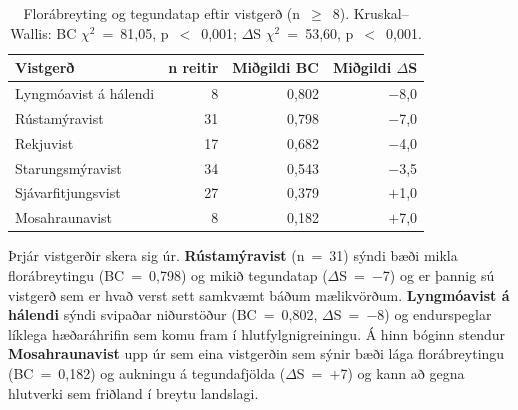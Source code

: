 \documentclass[12pt,a4paper]{article}
\begin{document}
\begin{table}[H]
\centering
\caption{Florábreyting og tegundatap eftir vistgerð (n~$\geq$~8).
Kruskal--Wallis: BC $\chi^2$~=~81,05, p~$<$~0,001;
$\Delta$S $\chi^2$~=~53,60, p~$<$~0,001.}
\label{tab:hab}
\begin{tabular}{lrrr}
\toprule
Vistgerð & n reitir & Miðgildi BC & Miðgildi $\Delta$S \\
\midrule
Lyngmóavist á hálendi  &  8 & 0,802 & $-$8,0 \\
Rústamýravist          & 31 & 0,798 & $-$7,0 \\
Rekjuvist              & 17 & 0,682 & $-$4,0 \\
Starungsmýravist       & 34 & 0,543 & $-$3,5 \\
Sjávarfitjungsvist     & 27 & 0,379 &  $+$1,0 \\
Mosahraunavist         &  8 & 0,182 &  $+$7,0 \\
\bottomrule
\end{tabular}
\end{table}

Þrjár vistgerðir skera sig úr. \textbf{Rústamýravist} (n~=~31) sýndi
bæði mikla florábreytingu (BC~=~0,798) og mikið tegundatap
($\Delta$S~=~$-$7) og er þannig sú vistgerð sem er hvað verst sett
samkvæmt báðum mælikvörðum. \textbf{Lyngmóavist á hálendi} sýndi
svipaðar niðurstöður (BC~=~0,802, $\Delta$S~=~$-$8) og endurspeglar
líklega hæðaráhrifin sem komu fram í hlutfylgnigreiningu. Á hinn bóginn
stendur \textbf{Mosahraunavist} upp úr sem eina vistgerðin sem sýnir bæði
lága florábreytingu (BC~=~0,182) og aukningu á tegundafjölda
($\Delta$S~=~$+$7) og kann að gegna hlutverki sem friðland í breytu
landslagi.

\printbibliography[title={Heimildir}, heading=subbib]
\end{document}
